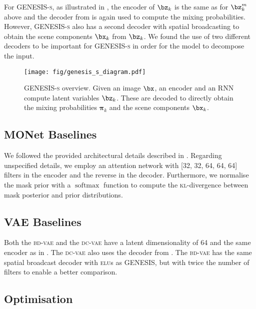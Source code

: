 \documentclass{article}
\begin{document}
For \gls{GENESIS}\textsc{-s}, as illustrated in , the encoder of $\bz_{k}$ is the same as for $\bz^m_{k}$ above and the decoder from \citet{berg2018sylvester} is again used to compute the mixing probabilities.
However, \gls{GENESIS}\textsc{-s} also has a second decoder with spatial broadcasting to obtain the scene components $\bx_{k}$ from $\bz_{k}$.
We found the use of two different decoders to be important for \gls{GENESIS}\textsc{-s} in order for the model to decompose the input.

\begin{figure}[h]
    \centering
    \texttt{[image: fig/genesis\_s\_diagram.pdf]}
    \caption{\gls{GENESIS}-\textsc{s} overview. Given an image $\bx$, an encoder and an \gls{RNN} compute latent variables $\bz_k$. These are decoded to directly obtain the mixing probabilities $\mathbf{\pi}_k$ and the scene components $\bx_k$.}
    \label{fig:arch_s}
\end{figure}


\subsection{MONet Baselines}
\label{app:monet_baseline}

We followed the provided architectural details described in \citet{burgess2019monet}.
Regarding unspecified details, we employ an attention network with [32, 32, 64, 64, 64] filters in the encoder and the reverse in the decoder.
Furthermore, we normalise the mask prior with a $\operatorname{softmax}$ function to compute the \textsc{kl}-divergence between mask posterior and prior distributions.


\subsection{VAE Baselines}
\label{app:vae_baseline}

Both the \textsc{bd-vae} and the \textsc{dc-vae} have a latent dimensionality of 64 and the same encoder as in \citet{berg2018sylvester}.
The \textsc{dc-vae} also uses the decoder from  \citet{berg2018sylvester}.
The \textsc{bd-vae} has the same spatial broadcast decoder with \textsc{elu}s as \gls{GENESIS}, but with twice the number of filters to enable a better comparison.


\subsection{Optimisation}
\end{document}
